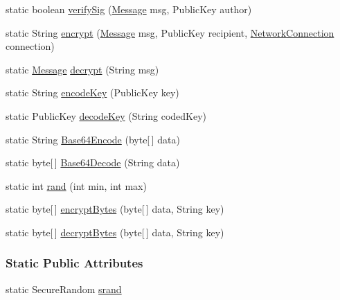 \begin{DoxyCompactItemize}
\item 
static boolean \hyperlink{classballmerpeak_1_1turtlenet_1_1server_1_1Crypto_ae5bdc4040fce3773ce9d5718d3bf8d0b}{verify\-Sig} (\hyperlink{classballmerpeak_1_1turtlenet_1_1shared_1_1Message}{Message} msg, Public\-Key author)
\item 
static String \hyperlink{classballmerpeak_1_1turtlenet_1_1server_1_1Crypto_ae3b4ea7217b7e91abd1d42f932611c85}{encrypt} (\hyperlink{classballmerpeak_1_1turtlenet_1_1shared_1_1Message}{Message} msg, Public\-Key recipient, \hyperlink{classballmerpeak_1_1turtlenet_1_1server_1_1NetworkConnection}{Network\-Connection} connection)
\item 
static \hyperlink{classballmerpeak_1_1turtlenet_1_1shared_1_1Message}{Message} \hyperlink{classballmerpeak_1_1turtlenet_1_1server_1_1Crypto_a74c30e340ade0ff1729abe05c772d3f7}{decrypt} (String msg)
\item 
static String \hyperlink{classballmerpeak_1_1turtlenet_1_1server_1_1Crypto_ac3423c536327620f518dab7f55d85b20}{encode\-Key} (Public\-Key key)
\item 
static Public\-Key \hyperlink{classballmerpeak_1_1turtlenet_1_1server_1_1Crypto_a78b5adee9b8deda2f2558fcc9aa3aa4b}{decode\-Key} (String coded\-Key)
\item 
static String \hyperlink{classballmerpeak_1_1turtlenet_1_1server_1_1Crypto_a9a8cf56daec604a46eff71fd42b21eef}{Base64\-Encode} (byte\mbox{[}$\,$\mbox{]} data)
\item 
static byte\mbox{[}$\,$\mbox{]} \hyperlink{classballmerpeak_1_1turtlenet_1_1server_1_1Crypto_a9ff76fd9368082d0e3fa77c9687d8bee}{Base64\-Decode} (String data)
\item 
static int \hyperlink{classballmerpeak_1_1turtlenet_1_1server_1_1Crypto_a226d168b01eb7f6c9b1c5c0984528a41}{rand} (int min, int max)
\item 
static byte\mbox{[}$\,$\mbox{]} \hyperlink{classballmerpeak_1_1turtlenet_1_1server_1_1Crypto_abfc04f2d0f6f92bcca41c53b6cdc667d}{encrypt\-Bytes} (byte\mbox{[}$\,$\mbox{]} data, String key)
\item 
static byte\mbox{[}$\,$\mbox{]} \hyperlink{classballmerpeak_1_1turtlenet_1_1server_1_1Crypto_aea88564254a1c6c217042419f304c1ef}{decrypt\-Bytes} (byte\mbox{[}$\,$\mbox{]} data, String key)
\end{DoxyCompactItemize}
\subsubsection*{Static Public Attributes}
\begin{DoxyCompactItemize}
\item 
static Secure\-Random \hyperlink{classballmerpeak_1_1turtlenet_1_1server_1_1Crypto_ad2ae6688f871ae46b7a5ae98b35d7000}{srand}
\end{DoxyCompactItemize}
